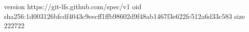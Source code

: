 version https://git-lfs.github.com/spec/v1
oid sha256:1d003126bfcdf4043c9eecff1ffb98602d9f48ab1467f3e622fc512a6d33c583
size 222722
